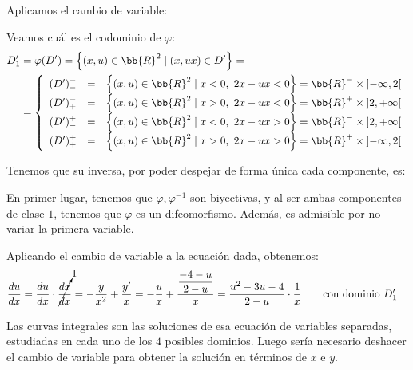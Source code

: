 \begin{ejercicio}
\begin{enumerate}
        Aplicamos el cambio de variable:

        Veamos cuál es el codominio de $\varphi$:
        \begin{align*}
            D'_1&=\varphi(D') = \left\{(x,u)\in \bb{R}^2 \mid (x, ux)\in D'\right\}
            =\\&=\left\{
                \begin{array}{rcl}      
                    (D')^-_- &=& \left\{(x,u)\in \bb{R}^2 \mid x<0,~2x-ux<0\right\}=\bb{R}^-\times \left]-\infty,2\right[\\
                    (D')^-_+ &=& \left\{(x,u)\in \bb{R}^2 \mid x>0,~2x-ux<0\right\}=\bb{R}^+\times \left]2,+\infty\right[\\
                    (D')^+_- &=& \left\{(x,u)\in \bb{R}^2 \mid x<0,~2x-ux>0\right\}=\bb{R}^-\times \left]2,+\infty\right[\\
                    (D')^+_+ &=& \left\{(x,u)\in \bb{R}^2 \mid x>0,~2x-ux>0\right\}=\bb{R}^+\times \left]-\infty,2\right[
                \end{array}
            \right.
        \end{align*}

        Tenemos que su inversa, por poder despejar de forma única cada componente, es:

        En primer lugar, tenemos que $\varphi,\varphi^{-1}$ son biyectivas, y al ser ambas componentes de clase $1$, tenemos que $\varphi$ es un difeomorfismo. Además, es admisible por no variar la primera variable.

        Aplicando el cambio de variable a la ecuación dada, obtenemos:
        \begin{align*}
            \dfrac{du}{dx} &= \dfrac{du}{dx}\cdot \cancelto{1}{\dfrac{dx}{dx}} = -\dfrac{y}{x^2} + \dfrac{y'}{x} = -\dfrac{u}{x} + \dfrac{\dfrac{-4-u}{2-u}}{x} = \dfrac{u^2-3u-4}{2-u} \cdot \dfrac{1}{x} \qquad \text{con dominio }D'_1
        \end{align*}

        Las curvas integrales son las soluciones de esa ecuación de variables separadas, estudiadas en cada uno de los $4$ posibles dominios. Luego sería necesario deshacer el cambio de variable para obtener la solución en términos de $x$ e $y$.
    \end{enumerate}
\end{ejercicio}